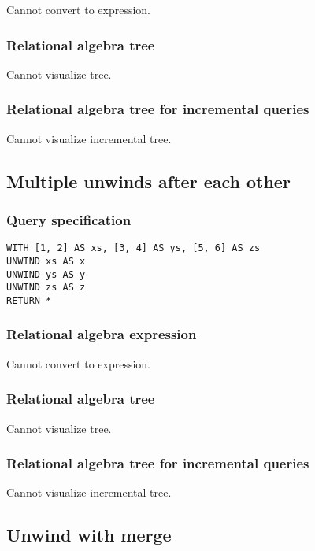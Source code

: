 Cannot convert to expression.

\subsubsection*{Relational algebra tree}

Cannot visualize tree.

\subsubsection*{Relational algebra tree for incremental queries}

Cannot visualize incremental tree.

\subsection{Multiple unwinds after each other}

\subsubsection*{Query specification}

\begin{lstlisting}
WITH [1, 2] AS xs, [3, 4] AS ys, [5, 6] AS zs
UNWIND xs AS x
UNWIND ys AS y
UNWIND zs AS z
RETURN *
\end{lstlisting}

\subsubsection*{Relational algebra expression}

Cannot convert to expression.

\subsubsection*{Relational algebra tree}

Cannot visualize tree.

\subsubsection*{Relational algebra tree for incremental queries}

Cannot visualize incremental tree.

\subsection{Unwind with merge}

